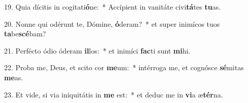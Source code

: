 19. Quia dícitis in cogitati\textbf{ó}ne:~*  Accípient in vanitáte civi\textbf{tá}tes \textbf{tu}as.\

20. Nonne qui odérunt te, Dómine, \textbf{ó}deram?~*  et super inimícos tuos \textbf{ta}be\textbf{scé}bam?\

21. Perfécto ódio óderam \textbf{il}los:~*  et inimíci \textbf{fac}ti sunt \textbf{mi}hi.\

22. Proba me, Deus, et scito cor \textbf{me}um:~*  intérroga me, et cognósce \textbf{sé}mitas \textbf{me}as.\

23. Et vide, si via iniquitátis in \textbf{me} est:~*  et deduc me in \textbf{vi}a æ\textbf{tér}na.\


